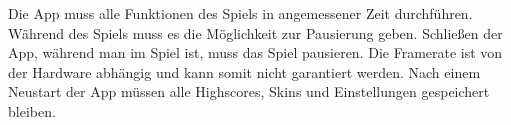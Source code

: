 Die App \gls{muss} alle Funktionen des Spiels in angemessener Zeit durchführen. 
Während des Spiels \gls{muss} es die Möglichkeit zur Pausierung geben.
Schließen der App, während man im Spiel ist, \gls{muss} das Spiel pausieren.
Die Framerate ist von der Hardware abhängig und kann somit nicht garantiert werden.
Nach einem Neustart der App müssen alle Highscores, Skins und Einstellungen gespeichert bleiben.